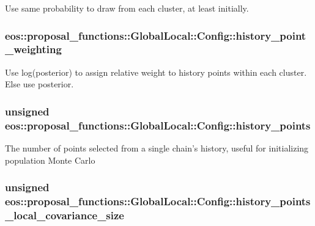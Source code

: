 Use same probability to draw from each cluster, at least initially. \hypertarget{structeos_1_1proposal__functions_1_1GlobalLocal_1_1Config_a67a276c92681a1da8953365d058b2951}{
\subsubsection[{history\_\-point\_\-weighting}]{ {\bf eos::proposal\_\-functions::GlobalLocal::Config::history\_\-point\_\-weighting}}}
\label{structeos_1_1proposal__functions_1_1GlobalLocal_1_1Config_a67a276c92681a1da8953365d058b2951}
Use log(posterior) to assign relative weight to history points within each cluster. Else use posterior. \hypertarget{structeos_1_1proposal__functions_1_1GlobalLocal_1_1Config_a1ab33a4656cb4c0f4eed805b9394c221}{
\subsubsection[{history\_\-points}]{\setlength{\rightskip}{0pt plus 5cm}unsigned {\bf eos::proposal\_\-functions::GlobalLocal::Config::history\_\-points}}}
\label{structeos_1_1proposal__functions_1_1GlobalLocal_1_1Config_a1ab33a4656cb4c0f4eed805b9394c221}
The number of points selected from a single chain's history, useful for initializing population Monte Carlo \hypertarget{structeos_1_1proposal__functions_1_1GlobalLocal_1_1Config_ac6b275330dd84325a42c3715d318551f}{
\subsubsection[{history\_\-points\_\-local\_\-covariance\_\-size}]{\setlength{\rightskip}{0pt plus 5cm}unsigned {\bf eos::proposal\_\-functions::GlobalLocal::Config::history\_\-points\_\-local\_\-covariance\_\-size}}}
